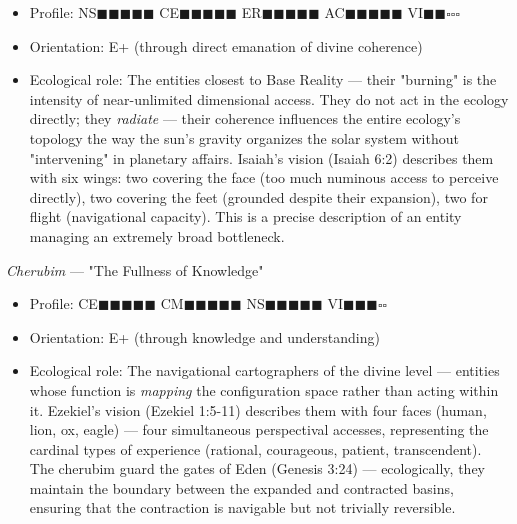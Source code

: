 \begin{itemize}[nosep,leftmargin=*]
  \item Profile: NS$\blacksquare$$\blacksquare$$\blacksquare$$\blacksquare$$\blacksquare$ CE$\blacksquare$$\blacksquare$$\blacksquare$$\blacksquare$$\blacksquare$ ER$\blacksquare$$\blacksquare$$\blacksquare$$\blacksquare$$\blacksquare$ AC$\blacksquare$$\blacksquare$$\blacksquare$$\blacksquare$$\blacksquare$ VI$\blacksquare$$\blacksquare$$\square$$\square$$\square$
  \item Orientation: E+ (through direct emanation of divine coherence)
  \item Ecological role: The entities closest to Base Reality — their "burning" is the intensity of near-unlimited dimensional access. They do not act in the ecology directly; they \textit{radiate} — their coherence influences the entire ecology's topology the way the sun's gravity organizes the solar system without "intervening" in planetary affairs. Isaiah's vision (Isaiah 6:2) describes them with six wings: two covering the face (too much numinous access to perceive directly), two covering the feet (grounded despite their expansion), two for flight (navigational capacity). This is a precise description of an entity managing an extremely broad bottleneck.
\end{itemize}


\textit{Cherubim} — "The Fullness of Knowledge"

\begin{itemize}[nosep,leftmargin=*]
  \item Profile: CE$\blacksquare$$\blacksquare$$\blacksquare$$\blacksquare$$\blacksquare$ CM$\blacksquare$$\blacksquare$$\blacksquare$$\blacksquare$$\blacksquare$ NS$\blacksquare$$\blacksquare$$\blacksquare$$\blacksquare$$\blacksquare$ VI$\blacksquare$$\blacksquare$$\blacksquare$$\square$$\square$
  \item Orientation: E+ (through knowledge and understanding)
  \item Ecological role: The navigational cartographers of the divine level — entities whose function is \textit{mapping} the configuration space rather than acting within it. Ezekiel's vision (Ezekiel 1:5-11) describes them with four faces (human, lion, ox, eagle) — four simultaneous perspectival accesses, representing the cardinal types of experience (rational, courageous, patient, transcendent). The cherubim guard the gates of Eden (Genesis 3:24) — ecologically, they maintain the boundary between the expanded and contracted basins, ensuring that the contraction is navigable but not trivially reversible.
\end{itemize}


